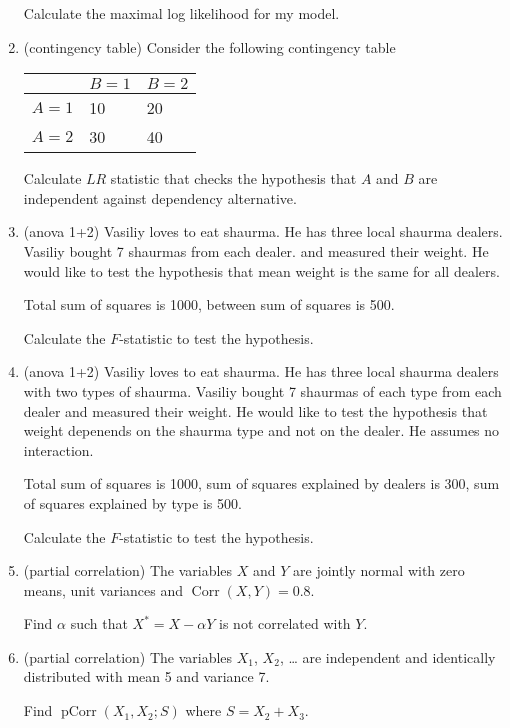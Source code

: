 \documentclass[12pt]{article}
\DeclareMathOperator{\Corr}{Corr}
\DeclareMathOperator{\pCorr}{pCorr}
\begin{document}
\begin{enumerate}
    Calculate the maximal log likelihood for my model.  
    \item (contingency table) Consider the following contingency table 
    
    \begin{tabular}{@{}lll@{}}
        \toprule
         & $B=1$ & $B=2$ \\ 
         \midrule
         $A=1$ & 10 & 20 \\
         $A=2$ & 30 & 40 \\
        \bottomrule
        \end{tabular}


    Calculate $LR$ statistic that checks the hypothesis that $A$ and $B$ are independent against dependency alternative. 

    \item (anova 1+2) Vasiliy loves to eat shaurma. He has three local shaurma dealers. Vasiliy bought 7 shaurmas from each dealer. 
    and measured their weight. He would like to test the hypothesis that mean weight is the same for all dealers. 

    Total sum of squares is 1000, between sum of squares is 500. 

    Calculate the $F$-statistic to test the hypothesis.
    
    \item (anova 1+2) Vasiliy loves to eat shaurma. He has three local shaurma dealers with two types of shaurma.  
    Vasiliy bought 7 shaurmas of each type from each dealer 
    and measured their weight. He would like to test the hypothesis that weight depenends on the shaurma type and not on the dealer.
    He assumes no interaction.  

    Total sum of squares is 1000, sum of squares explained by dealers is 300, sum of squares explained by type is 500. 

    Calculate the $F$-statistic to test the hypothesis.

    \item (partial correlation) The variables $X$ and $Y$ are jointly normal with zero means,
unit variances and $\Corr(X, Y) = 0.8$. 

Find $\alpha$ such that $X^* = X - \alpha Y$ is not correlated with $Y$. 

\item (partial correlation) The variables $X_1$, $X_2$, \ldots{ } are independent and identically distributed with mean 5 and variance 7. 

Find $\pCorr(X_1, X_2; S)$ where $S = X_2 + X_3$.
    
    
\end{enumerate}
\end{document}
